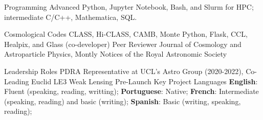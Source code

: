 

\begin{cvskills}

  \cvskill
    {Programming} %
    {Advanced Python, Jupyter Notebook, Bash, and Slurm for HPC; intermediate C/C++, Mathematica, SQL.} %

  \cvskill
    {Cosmological Codes} %
    {CLASS, Hi-CLASS, CAMB, Monte Python, Flask, CCL, Healpix, and Glass (co-developer)} %
  \cvskill
    {Peer Reviewer} %
    {Journal of Cosmology and Astroparticle Physics, Montly Notices of the Royal Astronomic Society}

\cvskill
    {Leadership Roles} %
    {PDRA Representative at UCL's Astro Group (2020-2022), Co-Leading Euclid LE3 Weak Lensing Pre-Launch Key Project}
    {}
\cvskill
    {Languages} %
    {\textbf{English}: Fluent (speaking, reading, writting); \textbf{Portuguese}: Native; \newline \textbf{French}: Intermediate (speaking, reading) and basic (writing); \textbf{Spanish}: Basic (writing, speaking, reading);}
    {}
\end{cvskills}
